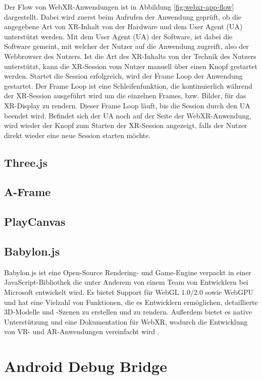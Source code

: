 Der Flow von WebXR-Anwendungen ist in Abbildung \ref{fig:webxr-app-flow} dargestellt.
Dabei wird zuerst beim Aufrufen der Anwendung geprüft, ob die angegebene Art von XR-Inhalt von der Hardware und dem User Agent (UA) unterstützt werden.
Mit dem User Agent (UA) der Software, ist dabei die Software gemeint, mit welcher der Nutzer auf die Anwendung zugreift, also der Webbrowser des Nutzers.
Ist die Art des XR-Inhalts von der Technik des Nutzers unterstützt, kann die XR-Session vom Nutzer manuell über einen Knopf gestartet werden.
Startet die Session erfolgreich, wird der Frame Loop der Anwendung gestartet.
Der Frame Loop ist eine Schleifenfunktion, die kontinuierlich während der XR-Session ausgeführt wird um die einzelnen Frames, bzw. Bilder, für das XR-Display zu rendern.
Dieser Frame Loop läuft, bis die Session durch den UA beendet wird.
Befindet sich der UA noch auf der Seite der WebXR-Anwendung, wird wieder der Knopf zum Starten der XR-Session angezeigt, falls der Nutzer direkt wieder eine neue Session starten möchte.

\subsection{Three.js}

\subsection{A-Frame}

\subsection{PlayCanvas}

\subsection{Babylon.js}

Babylon.js ist eine Open-Source Rendering- und Game-Engine verpackt in einer JavaScript-Bibliothek die unter Anderem von einem Team von Entwicklern bei Microsoft entwickelt wird.
Es bietet Support für WebGL 1.0/2.0 sowie WebGPU und hat eine Vielzahl von Funktionen, die es Entwicklern ermöglichen, detaillierte 3D-Modelle und -Szenen zu erstellen und zu rendern.
Außerdem bietet es native Unterstützung und eine Dokumentation für WebXR, wodurch die Entwicklung von VR- und AR-Anwendungen vereinfacht wird \autocite[][]{babylon-features}.


\section{Android Debug Bridge}